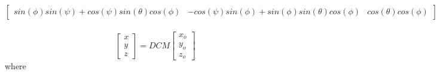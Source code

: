 \documentclass[../../main.tex]{subfiles}
\begin{document}
\begin{itemize}
\begin{enumerate}
{\begin{equation}
\begin{bmatrix}
            sin(\phi)sin(\psi)+cos(\psi)sin(\theta)cos(\phi) & -cos(\psi)sin(\phi)+sin(\phi)sin(\theta)cos(\phi) & cos(\theta)cos(\phi)
            \end{bmatrix}
        \end{equation}
        }\\
        \begin{equation}
            \begin{bmatrix}
            x\\y\\z
            \end{bmatrix} = DCM 
            \begin{bmatrix}
            x_{o}\\y_{o}\\z_{o}
            \end{bmatrix}
        \end{equation}
        where \
        
    \end{enumerate}
\end{itemize}

\end{document}
